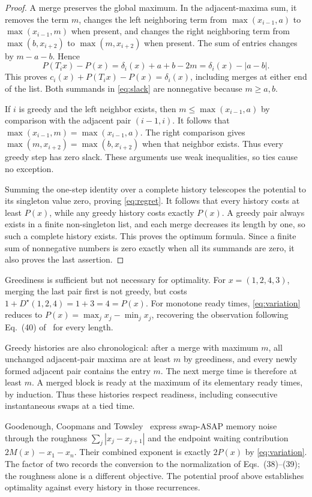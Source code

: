 \documentclass[11pt,a4paper]{article}
\newcommand{\Dstar}{D^{\star}}
\begin{document}
\begin{proof}
A merge preserves the global maximum. In the adjacent-maxima sum, it
removes the term $m$, changes the left neighboring term from
$\max(x_{i-1},a)$ to $\max(x_{i-1},m)$ when present, and changes the right
neighboring term from $\max(b,x_{i+2})$ to $\max(m,x_{i+2})$ when present.
The sum of entries changes by $m-a-b$. Hence
\[
 P(T_i x)-P(x)=\delta_i(x)+a+b-2m
             =\delta_i(x)-|a-b|.
\]
This proves $c_i(x)+P(T_i x)-P(x)=\delta_i(x)$, including merges
at either end of the list. Both summands in \eqref{eq:slack} are
nonnegative because $m\geq a,b$.

If $i$ is greedy and the left neighbor exists, then
$m\leq\max(x_{i-1},a)$ by comparison with the adjacent pair $(i-1,i)$.
It follows that
$\max(x_{i-1},m)=\max(x_{i-1},a)$.
The right comparison gives
$\max(m,x_{i+2})=\max(b,x_{i+2})$ when that neighbor exists.
Thus every greedy step has zero slack. These arguments use weak
inequalities, so ties cause no exception.

Summing the one-step identity over a complete history telescopes the
potential to its singleton value zero, proving \eqref{eq:regret}.
It follows that every history costs at least $P(x)$, while any greedy
history costs exactly $P(x)$. A greedy pair always exists in a finite
non-singleton list, and each merge decreases its length by one, so such a
complete history exists. This proves the optimum formula. Since a finite
sum of nonnegative numbers is zero exactly when all its summands are
zero, it also proves the last assertion.
\end{proof}

Greediness is sufficient but not necessary for optimality. For
$x=(1,2,4,3)$, merging the last pair first is not greedy, but costs
$1+\Dstar(1,2,4)=1+3=4=P(x)$. For monotone ready times,
\eqref{eq:variation} reduces to $P(x)=\max_jx_j-\min_jx_j$, recovering
the observation following Eq.~(40) of~\cite{kamin} for every length.

Greedy histories are also chronological: after a merge with maximum $m$,
all unchanged adjacent-pair maxima are at least $m$ by greediness, and
every newly formed adjacent pair contains the entry $m$. The next merge
time is therefore at least $m$. A merged block is ready at the maximum
of its elementary ready times, by induction. Thus these histories respect
readiness, including consecutive instantaneous swaps at a tied time.

Goodenough, Coopmans and Towsley~\cite[Sec.~3.1]{goodenough} express
swap-ASAP memory noise through the roughness
$\sum_j|x_j-x_{j+1}|$ and the endpoint waiting contribution
$2M(x)-x_1-x_n$. Their combined exponent is exactly $2P(x)$ by
\eqref{eq:variation}. The factor of two records the conversion to the
normalization of Eqs.~(38)--(39); the roughness alone is a different
objective. The potential proof above establishes optimality against
every history in those recurrences.
\end{document}
